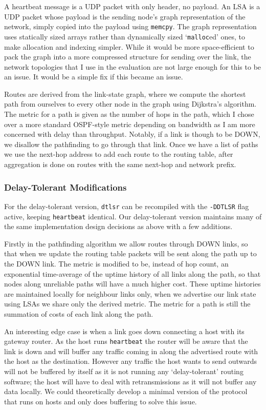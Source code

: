 \documentclass[10pt,twoside,a4paper]{article}
\begin{document}
A heartbeat message is a UDP packet with only header, no payload. An LSA is a UDP packet whose payload is the sending node's graph representation of the network, simply copied into the payload using \texttt{memcpy}. The graph representation uses statically sized arrays rather than dynamically sized `\texttt{malloc}ed' ones, to make allocation and indexing simpler. While it would be more space-efficient to pack the graph into a more compressed structure for sending over the link, the network topologies that I use in the evaluation are not large enough for this to be an issue. It would be a simple fix if this became an issue.

Routes are derived from the link-state graph, where we compute the shortest path from ourselves to every other node in the graph using Dijkstra's algorithm. The metric for a path is given as the number of hops in the path, which I chose over a more standard OSPF-style metric depending on bandwidth as I am more concerned with delay than throughput. Notably, if a link is though to be DOWN, we disallow the pathfinding to go through that link. Once we have a list of paths we use the next-hop address to add each route to the routing table, after aggregation is done on routes with the same next-hop and network prefix.

\subsubsection{Delay-Tolerant Modifications}

For the delay-tolerant version, \texttt{dtlsr} can be recompiled with the \texttt{-DDTLSR} flag active, keeping \texttt{heartbeat} identical. Our delay-tolerant version maintains many of the same implementation design decisions as above with a few additions.

Firstly in the pathfinding algorithm we allow routes through DOWN links, so that when we update the routing table packets will be sent along the path up to the DOWN link. The metric is modified to be, instead of hop count, an exponential time-average of the uptime history of all links along the path, so that nodes along unreliable paths will have a much higher cost. These uptime histories are maintained locally for neighbour links only, when we advertise our link state using LSAs we share only the derived metric. The metric for a path is still the summation of costs of each link along the path.

An interesting edge case is when a link goes down connecting a host with its gateway router. As the host runs \texttt{heartbeat} the router will be aware that the link is down and will buffer any traffic coming in along the advertised route with the host as the destination. However any traffic the host wants to send outwards will not be buffered by itself as it is not running any `delay-tolerant' routing software; the host will have to deal with retransmissions as it will not buffer any data locally. We could theoretically develop a minimal version of the protocol that runs on hosts and only does buffering to solve this issue.
\end{document}
